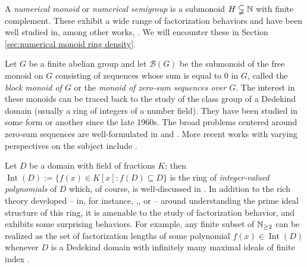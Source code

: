 \begin{eg} \label{eg: numerical monoid}
A \textit{numerical monoid} or \textit{numerical semigroup} is a submonoid $H \subsetneqq \mathbb{N}$ with finite complement.
These exhibit a wide range of factorization behaviors and have been well studied in, among other works, \cite{oneill-pelayo17,oneill-pelayo18,barron-oneill-pelayo17,geroldinger-schmid18,conaway-etal18}.
We will encounter these in Section \ref{sec:numerical monoid ring density}.
\end{eg}

\begin{eg} \label{eg: block monoids}
Let $G$ be a finite abelian group and let $\mathcal{B}(G)$ be the submonoid of the free monoid on $G$ consisting of zequences whose sum is equal to $0$ in $G$, called the \textit{block monoid of $G$} or the \textit{monoid of zero-sum sequences over $G$}.
The interest in these monoids can be traced back to the study of the class group of a Dedekind domain (usually a ring of integers of a number field).  They have been studied in some form or another since the late 1960s.
The broad problems centered around zero-sum sequences are well-formulated in \cite{gao-geroldinger06} and \cite{geroldinger-hk06}.
More recent works with varying perspectives on the subject include \cite{gao-al18,savchev-chen17,girard-schmid19,girard-schmid20}.
\end{eg}

\begin{eg} \label{eg: integer-valued polynomials}
Let $D$ be a domain with field of fractions $K$; then $\operatorname{Int}(D) := \{f(x) \in K[x]: f(D) \subseteq D \}$ is the ring of \textit{integer-valued polynomials} of $D$ which, of course, is well-discussed in \cite{cahen-chabert97}.
In addition to the rich theory developed -- in, for instance, \cite{loper97a},\cite{loper97b}, or \cite{chapman-loper-smith02} -- around understanding the prime ideal structure of this ring, it is amenable to the study of factorization behavior, and exhibits some surprising behaviors.  
For example, any finite subset of $\mathbb{N}_{\ge2}$ can be realized as the set of factorization lengths of some polynomial $f(x)\in \operatorname{Int}(D)$ whenever $D$ is a Dedekind domain with infinitely many maximal ideals of finite index \cite{frisch-al19,frisch13}.
\end{eg}


